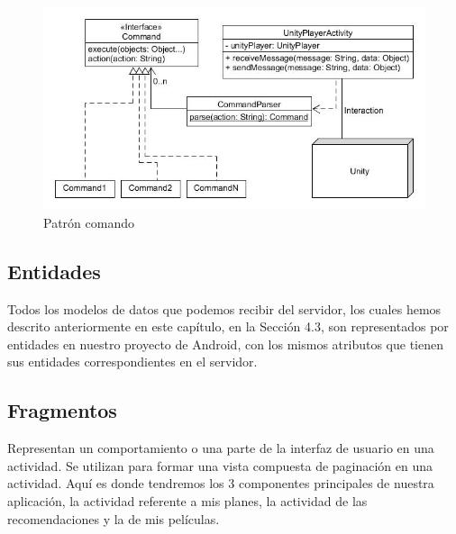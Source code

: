 \begin{figure}[H]
    \centering
    \includegraphics[width=6in]{figures/chapter-4/command.jpg}
    \caption{Patrón comando}
    \label{fig:comando}
\end{figure}



\subsection{Entidades}
\label{makereference4.4.4}
Todos los modelos de datos que podemos recibir del servidor, los cuales hemos descrito anteriormente en este capítulo, en la Sección 4.3, son representados por entidades en nuestro proyecto de Android, con los mismos atributos que tienen sus entidades correspondientes en el servidor.

\subsection{Fragmentos}
\label{makereference4.4.5}
Representan un comportamiento o una parte de la interfaz de usuario en una actividad.
Se utilizan para formar una vista compuesta de paginación en una actividad. 
Aquí es donde tendremos los 3 componentes principales de nuestra aplicación, la actividad referente a mis planes, la actividad de las recomendaciones y la de mis películas.

